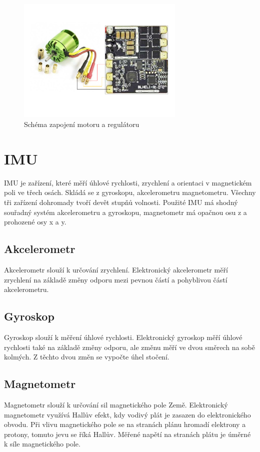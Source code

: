 \begin{figure}[H]
	\centering
	\includegraphics[width=8cm]{pictures/motor.pdf}
	\caption{Schéma zapojení motoru a regulátoru}
\end{figure}

\section{IMU}
IMU je zařízení, které měří úhlové rychlosti, zrychlení a orientaci v magnetickém poli ve třech osách. Skládá se z gyroskopu, akcelerometru  magnetometru. Všechny tři zařízení dohromady tvoří devět stupňů volnosti.  Použité IMU má shodný souřadný systém akcelerometru a gyroskopu, magnetometr má opačnou osu z a prohozené osy x a y.\cite{imu}\\

\subsection{Akcelerometr}
Akcelerometr slouží k určování zrychlení. Elektronický akcelerometr měří zrychlení na základě změny odporu mezi pevnou částí a pohyblivou částí akcelerometru. \\

\subsection{Gyroskop}
Gyroskop slouží k měření úhlové rychlosti.  Elektronický gyroskop měří úhlové rychlosti také na základě změny odporu, ale změnu měří ve dvou směrech na sobě kolmých. Z těchto dvou změn se vypočte úhel stočení.\\

\subsection{Magnetometr}
Magnetometr slouží k určování sil magnetického pole Země. Elektronický magnetometr využívá Hallův efekt, kdy vodivý plát je zasazen do elektronického obvodu. Při vlivu magnetického pole se na stranách plánu hromadí elektrony a protony, tomuto jevu se říká Hallův. Měřené napětí na stranách plátu je úměrné k síle magnetického pole.\\


